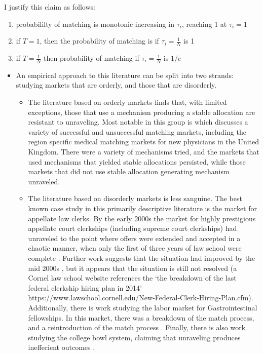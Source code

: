 \documentclass[WP]{AEA}
\begin{document}
I justify this claim as follows:
\begin{enumerate}
	\item probabililty of matching is monotonic increasing in $\tau_i$, reaching 1 at $\tau_i = 1$
	\item if $T=1$, then the probability of matching is if $\tau_i = \frac{1}{N}$ is 1
	\item if $T =  \frac{1}{N}$ then probability of matching if $\tau_i = \frac{1}{N}$ is $1/e$
	
	
\end{enumerate}

\begin{itemize}
	\item An empirical approach to this literature can be split into two strands: studying markets that are orderly, and those that are disorderly. 
	\begin{itemize}
		\item The literature based on orderly markets finds that, with limited exceptions, those that use a mechanism producing a stable allocation are resistant to unraveling.  Most notable in this group is  \cite{Roth2002} which discusses a variety of successful and unsuccessful matching markets, including the region specific medical matching markets for new physicians in the United Kingdom.  There were a variety of mechanisms tried, and the markets that used mechanisms that yielded stable allocations persisted, while those markets that did not use stable allocation generating mechanism unraveled.
		\item The literature based on disorderly markets is less sanguine. The best known case study in this primarily descriptive literature is the market for appellate law clerks.  By the early 2000s the market for highly prestigious appellate court clerkships (including supreme court clerkships) had unraveled to the point where offers were extended and accepted in a chaotic manner, when only the first of three years of law school were complete \cite{Avery2001}.  Further work suggests that the situation had improved by the mid 2000s \cite{Avery2007}, but it appears that the situation is still not resolved (a Cornel law school website references the `the breakdown of the last federal clerkship hiring plan in 2014' https://www.lawschool.cornell.edu/New-Federal-Clerk-Hiring-Plan.cfm). Additionally, there is work studying the labor market for Gastrointestinal fellowships.  In this market, there was a breakdown of the match process, and a reintroduction of the match process \cite{Niederle2008,Niederle2003}.  Finally, there is also work studying the college bowl system, claiming that unraveling produces ineffecient outcomes \cite{Frechette2007}.
	\end{itemize}
	 

\end{itemize}
\end{document}
